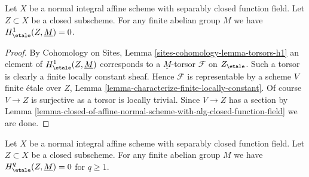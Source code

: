 \begin{lemma}
\label{lemma-gabber-for-h1-absolutely-algebraically-closed}
Let $X$ be a normal integral affine scheme with separably closed
function field. Let $Z \subset X$ be a closed subscheme.
For any finite abelian group $M$ we have $H^1_\etale(Z, \underline{M}) = 0$.
\end{lemma}

\begin{proof}
By Cohomology on Sites, Lemma \ref{sites-cohomology-lemma-torsors-h1}
an element of $H^1_\etale(Z, \underline{M})$ corresponds to a
$\underline{M}$-torsor $\mathcal{F}$ on $Z_\etale$.
Such a torsor is clearly a finite locally constant sheaf.
Hence $\mathcal{F}$ is representable by a scheme $V$ finite
\'etale over $Z$, Lemma \ref{lemma-characterize-finite-locally-constant}.
Of course $V \to Z$ is surjective as a torsor is locally trivial.
Since $V \to Z$ has a section by
Lemma \ref{lemma-closed-of-affine-normal-scheme-with-alg-closed-function-field}
we are done.
\end{proof}

\begin{lemma}
\label{lemma-gabber-for-absolutely-algebraically-closed}
Let $X$ be a normal integral affine scheme with separably closed
function field. Let $Z \subset X$ be a closed subscheme.
For any finite abelian group $M$ we have
$H^q_\etale(Z, \underline{M}) = 0$ for $q \geq 1$.
\end{lemma}

